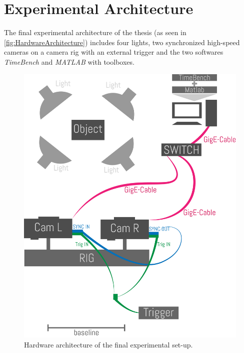 \section{Experimental Architecture} \label{sec:architecture}
The final experimental architecture of the thesis (as seen in \autoref{fig:HardwareArchitecture}) includes four lights, two synchronized high-speed cameras on a camera rig with an external trigger and the two softwares \textit{TimeBench} and \textit{MATLAB} with toolboxes. 

\begin{figure}[htbp]
		\centering
		\includegraphics[width=1.0\textwidth]{figures/HardwareArchitecture}
		\caption[Hardware architecture of the final experimental set-up]{Hardware architecture of the final experimental set-up.}
		\label{fig:HardwareArchitecture}
\end{figure}